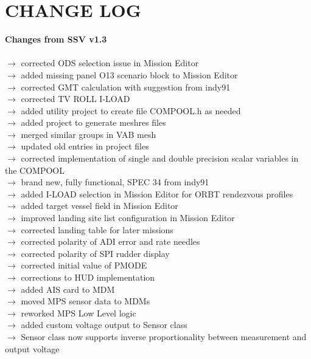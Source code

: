\documentclass[Space_Shuttle_Vessel_Manual.tex]{subfiles}
\begin{document}
\section{CHANGE LOG}
\label{sec:change-log}
\noindent
\textbf{Changes from SSV v1.3}\\\\
$\rightarrow$ corrected ODS selection issue in Mission Editor\\
$\rightarrow$ added missing panel O13 scenario block to Mission Editor\\
$\rightarrow$ corrected GMT calculation with suggestion from indy91\\
$\rightarrow$ corrected TV ROLL I-LOAD\\
$\rightarrow$ added utility project to create file COMPOOL.h as needed\\
$\rightarrow$ added project to generate meshres files\\
$\rightarrow$ merged similar groups in VAB mesh\\
$\rightarrow$ updated old entries in project files\\
$\rightarrow$ corrected implementation of single and double precision scalar variables in the COMPOOL\\
$\rightarrow$ brand new, fully functional, SPEC 34 from indy91\\
$\rightarrow$ added I-LOAD selection in Mission Editor for ORBT rendezvous profiles\\
$\rightarrow$ added target vessel field in Mission Editor\\
$\rightarrow$ improved landing site list configuration in Mission Editor\\
$\rightarrow$ corrected landing table for later missions\\
$\rightarrow$ corrected polarity of ADI error and rate needles\\
$\rightarrow$ corrected polarity of SPI rudder display\\
$\rightarrow$ corrected initial value of PMODE\\
$\rightarrow$ corrections to HUD implementation\\
$\rightarrow$ added AIS card to MDM\\
$\rightarrow$ moved MPS sensor data to MDMs\\
$\rightarrow$ reworked MPS Low Level logic\\
$\rightarrow$ added custom voltage output to Sensor class\\
$\rightarrow$ Sensor class now supports inverse proportionality between measurement and output voltage\\
\end{document}
